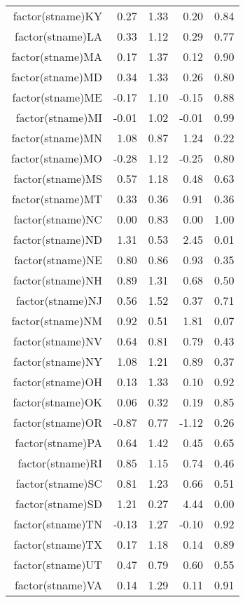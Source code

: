 \begin{table}[ht]
\begin{tabular}{rrrrr}
  factor(stname)KY & 0.27 & 1.33 & 0.20 & 0.84 \\ 
  factor(stname)LA & 0.33 & 1.12 & 0.29 & 0.77 \\ 
  factor(stname)MA & 0.17 & 1.37 & 0.12 & 0.90 \\ 
  factor(stname)MD & 0.34 & 1.33 & 0.26 & 0.80 \\ 
  factor(stname)ME & -0.17 & 1.10 & -0.15 & 0.88 \\ 
  factor(stname)MI & -0.01 & 1.02 & -0.01 & 0.99 \\ 
  factor(stname)MN & 1.08 & 0.87 & 1.24 & 0.22 \\ 
  factor(stname)MO & -0.28 & 1.12 & -0.25 & 0.80 \\ 
  factor(stname)MS & 0.57 & 1.18 & 0.48 & 0.63 \\ 
  factor(stname)MT & 0.33 & 0.36 & 0.91 & 0.36 \\ 
  factor(stname)NC & 0.00 & 0.83 & 0.00 & 1.00 \\ 
  factor(stname)ND & 1.31 & 0.53 & 2.45 & 0.01 \\ 
  factor(stname)NE & 0.80 & 0.86 & 0.93 & 0.35 \\ 
  factor(stname)NH & 0.89 & 1.31 & 0.68 & 0.50 \\ 
  factor(stname)NJ & 0.56 & 1.52 & 0.37 & 0.71 \\ 
  factor(stname)NM & 0.92 & 0.51 & 1.81 & 0.07 \\ 
  factor(stname)NV & 0.64 & 0.81 & 0.79 & 0.43 \\ 
  factor(stname)NY & 1.08 & 1.21 & 0.89 & 0.37 \\ 
  factor(stname)OH & 0.13 & 1.33 & 0.10 & 0.92 \\ 
  factor(stname)OK & 0.06 & 0.32 & 0.19 & 0.85 \\ 
  factor(stname)OR & -0.87 & 0.77 & -1.12 & 0.26 \\ 
  factor(stname)PA & 0.64 & 1.42 & 0.45 & 0.65 \\ 
  factor(stname)RI & 0.85 & 1.15 & 0.74 & 0.46 \\ 
  factor(stname)SC & 0.81 & 1.23 & 0.66 & 0.51 \\ 
  factor(stname)SD & 1.21 & 0.27 & 4.44 & 0.00 \\ 
  factor(stname)TN & -0.13 & 1.27 & -0.10 & 0.92 \\ 
  factor(stname)TX & 0.17 & 1.18 & 0.14 & 0.89 \\ 
  factor(stname)UT & 0.47 & 0.79 & 0.60 & 0.55 \\ 
  factor(stname)VA & 0.14 & 1.29 & 0.11 & 0.91 \\ 

\end{tabular}
\end{table}
